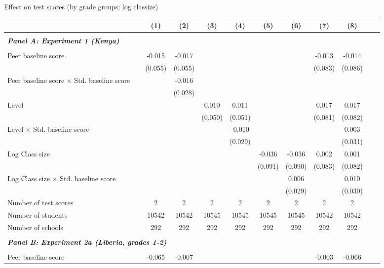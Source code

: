 \begin{center} 
\caption{\small Effect on test scores (by grade groups; log classize)} 
\label{tab:descriptives} 
\begin{scriptsize}
\begin{threeparttable}
\begin{tabular} {@{} l l c c c c c c c c c c  @{}} \toprule \toprule
& &(1)&(2)&(3)&(4)&(5)&(6)&(7)&(8) \\ \midrule 
\\
\multicolumn{3}{l}{\textbf{\textit{Panel A: Experiment 1 (Kenya)}}} \\
\\
Peer baseline score &  & -0.015 & -0.017 &  &  &  &  & -0.013 & -0.014 \\
                 &  & (0.055) & (0.055) &  &  &  &  & (0.083) & (0.086) \\
Peer baseline score $\times$ Std. baseline score &  &  & -0.016 &  &  &  &  &  &  \\
                 &  &  & (0.028) &  &  &  &  &  &  \\
Level &  &  &  & 0.010 & 0.011 &  &  & 0.017 & 0.017 \\
                 &  &  &  & (0.050) & (0.051) &  &  & (0.081) & (0.082) \\
Level $\times$ Std. baseline score &  &  &  &  & -0.010 &  &  &  & 0.003 \\
                 &  &  &  &  & (0.029) &  &  &  & (0.031) \\
Log Class size &  &  &  &  &  & -0.036 & -0.036 & 0.002 & 0.001 \\
                 &  &  &  &  &  & (0.091) & (0.090) & (0.083) & (0.082) \\
Log Class size $\times$ Std. baseline score &  &  &  &  &  &  & 0.006 &  & 0.010 \\
                 &  &  &  &  &  &  & (0.029) &  & (0.030) \\
\midrule
Number of test scores &  & 2 & 2 & 2 & 2 & 2 & 2 & 2 & 2 \\
Number of students &  & 10542 & 10542 & 10545 & 10545 & 10545 & 10545 & 10542 & 10542 \\
Number of schools &  & 292 & 292 & 292 & 292 & 292 & 292 & 292 & 292 \\
 \midrule
\\
\multicolumn{3}{l}{\textbf{\textit{Panel B: Experiment 2a (Liberia, grades 1-2)}}} \\
\\
Peer baseline score &  & -0.065 & -0.007 &  &  &  &  & -0.003 & -0.066 \\

\end{tabular}
\end{threeparttable}
\end{scriptsize}
\end{center}
